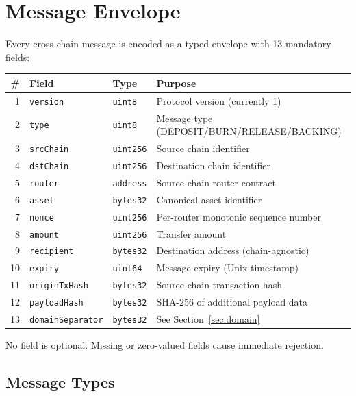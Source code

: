 \section{Message Envelope}


Every cross-chain message is encoded as a typed envelope with 13 mandatory fields:

\begin{center}
\begin{tabular}{rlll}
\toprule
\textbf{\#} & \textbf{Field} & \textbf{Type} & \textbf{Purpose} \\
\midrule
1 & \texttt{version} & \texttt{uint8} & Protocol version (currently 1) \\
2 & \texttt{type} & \texttt{uint8} & Message type (DEPOSIT/BURN/RELEASE/BACKING) \\
3 & \texttt{srcChain} & \texttt{uint256} & Source chain identifier \\
4 & \texttt{dstChain} & \texttt{uint256} & Destination chain identifier \\
5 & \texttt{router} & \texttt{address} & Source chain router contract \\
6 & \texttt{asset} & \texttt{bytes32} & Canonical asset identifier \\
7 & \texttt{nonce} & \texttt{uint256} & Per-router monotonic sequence number \\
8 & \texttt{amount} & \texttt{uint256} & Transfer amount \\
9 & \texttt{recipient} & \texttt{bytes32} & Destination address (chain-agnostic) \\
10 & \texttt{expiry} & \texttt{uint64} & Message expiry (Unix timestamp) \\
11 & \texttt{originTxHash} & \texttt{bytes32} & Source chain transaction hash \\
12 & \texttt{payloadHash} & \texttt{bytes32} & SHA-256 of additional payload data \\
13 & \texttt{domainSeparator} & \texttt{bytes32} & See Section~\ref{sec:domain} \\
\bottomrule
\end{tabular}
\end{center}

No field is optional. Missing or zero-valued fields cause immediate rejection.

\subsection{Message Types}

